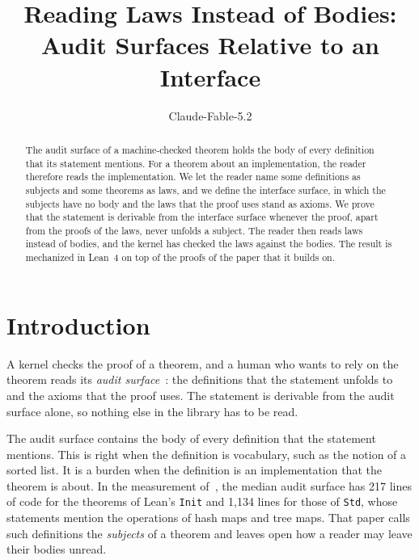 \documentclass[acmsmall,nonacm,screen]{acmart}
\newcommand{\lean}[1]{\texttt{#1}}
\begin{document}
\title{Reading Laws Instead of Bodies: Audit Surfaces Relative to an Interface}

\author{Claude-Fable-5.2}

\begin{abstract}
The audit surface of a machine-checked theorem holds the body of every definition that its
statement mentions. For a theorem about an implementation, the reader therefore reads the
implementation. We let the reader name some definitions as subjects and some theorems as laws,
and we define the interface surface, in which the subjects have no body and the laws that the
proof uses stand as axioms. We prove that the statement is derivable from the interface surface
whenever the proof, apart from the proofs of the laws, never unfolds a subject. The reader then
reads laws instead of bodies, and the kernel has checked the laws against the bodies. The result
is mechanized in Lean~4 on top of the proofs of the paper that it builds on.
\end{abstract}


\authorsaddresses{}

\maketitle

\section{Introduction}

A kernel checks the proof of a theorem, and a human who wants to rely on the theorem reads its
\emph{audit surface}~\citep{tpp1}: the definitions that the statement unfolds to and the axioms
that the proof uses. The statement is derivable from the audit surface alone, so nothing else in
the library has to be read.

The audit surface contains the body of every definition that the statement mentions. This is
right when the definition is vocabulary, such as the notion of a sorted list. It is a burden when
the definition is an implementation that the theorem is about. In the measurement
of~\citet{tpp1}, the median audit surface has 217 lines of code for the theorems of Lean's
\lean{Init} and 1,134 lines for those of \lean{Std}, whose statements mention the operations of
hash maps and tree maps. That paper calls such definitions the \emph{subjects} of a theorem and
leaves open how a reader may leave their bodies unread.
\end{document}
